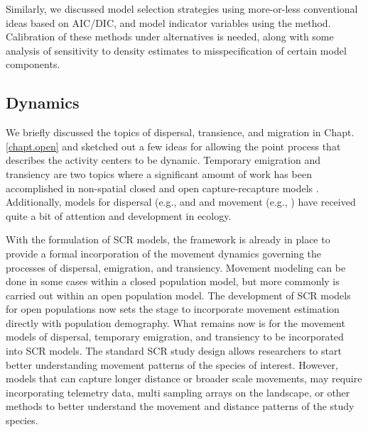 Similarly, we discussed model selection strategies using more-or-less
conventional ideas based on AIC/DIC, and model indicator variables
using the \citet{kuo_mallick:1998} method. Calibration of these
methods under alternatives is needed, along with some analysis of
sensitivity to density estimates to misspecification of certain model
components.


\subsection{Dynamics}


We briefly discussed the topics of dispersal,
transience, and migration in Chapt. \ref{chapt.open} and sketched out
a few ideas for allowing the point process that describes the activity centers
to be dynamic. %
Temporary emigration and transiency are two topics where
a significant amount of work has been accomplished in non-spatial closed and open capture-recapture
models \citep{kendall_etal:1997, pradel_hines:1997, hines_etal:2003,
clavel_etal:2008, gilroy_etal:2012,chandler_etal:2011}.
Additionally, models for dispersal (e.g., \citet{clobert_etal:2001,
ovaskainen:2004, ovaskainen_etal:2008} and 
and movement (e.g., \cite{jonsen_etal:2005, johnson_etal:2008b,
mcclintock_etal:2012}) have received quite a bit of attention and development in
ecology.

With the formulation of SCR models, the framework is already in place to provide
a formal incorporation of the movement dynamics governing the processes
of dispersal, emigration, and transiency. Movement modeling can be done 
in some cases within a closed
population model, but more commonly is carried out within an open population model.
The development of SCR models for open populations \citep{gardner_etal:2012} now sets 
the stage to incorporate
movement estimation directly with population demography. What remains now is for the 
movement models 
of dispersal, temporary emigration, and transiency to be incorporated into SCR models.
The standard SCR study design allows researchers to start better understanding movement patterns of 
the species of interest.  However, models that can capture longer distance or broader scale movements,
may require incorporating telemetry data, multi sampling arrays on the landscape, or other 
methods to better understand the movement and distance patterns of the study species.

